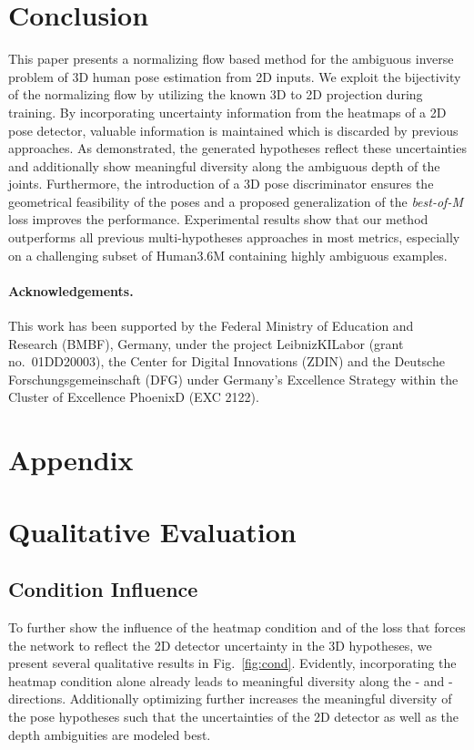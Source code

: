 \documentclass[10pt,twocolumn,letterpaper]{article}
\begin{document}
\section{Conclusion}
This paper presents a normalizing flow based method for the ambiguous inverse problem of 3D human pose estimation from 2D inputs.
We exploit the bijectivity of the normalizing flow by utilizing the known 3D to 2D projection during training.
By incorporating uncertainty information from the heatmaps of a 2D pose detector, valuable information is maintained which is discarded by previous approaches.
As demonstrated, the generated hypotheses reflect these uncertainties and additionally show meaningful diversity along the ambiguous depth of the joints.
Furthermore, the introduction of a 3D pose discriminator ensures the geometrical feasibility of the poses and a proposed generalization of the \textit{best-of-M} loss improves the performance. 
Experimental results show that our method outperforms all previous multi-hypotheses approaches in most metrics, especially on a challenging subset of Human3.6M containing highly ambiguous examples.
\vspace{-1.0em}
\small{\paragraph{Acknowledgements.}
This work has been supported by the Federal Ministry of Education and Research (BMBF), Germany, under the project LeibnizKILabor (grant no.\ 01DD20003), the Center for Digital Innovations (ZDIN) and the Deutsche Forschungsgemeinschaft (DFG) under Germany’s Excellence Strategy within the Cluster of Excellence PhoenixD (EXC 2122).}



\newpage
\clearpage
{\small


}




\renewcommand\thesection{\Alph{section}}
\renewcommand\thesubsection{\thesection.\arabic{subsection}}
\appendix

\section*{Appendix}

\section{Qualitative Evaluation}

\subsection{Condition Influence}
To further show the influence of the heatmap condition and of the loss  that forces the network to reflect the 2D detector uncertainty in the 3D hypotheses, we present several qualitative results in Fig.~\ref{fig:cond}.
Evidently, incorporating the heatmap condition alone already leads to meaningful diversity along the - and - directions.
Additionally optimizing  further increases the meaningful diversity of the pose hypotheses such that the uncertainties of the 2D detector as well as the depth ambiguities are modeled best.
\end{document}
